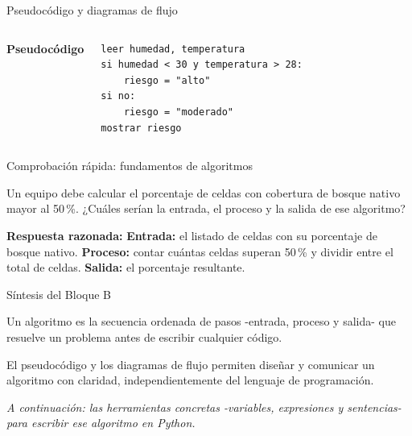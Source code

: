 \documentclass[aspectratio=169,11pt]{beamer}
\begin{document}
\begin{frame}[fragile]{Pseudocódigo y diagramas de flujo}
\small
\begin{columns}[T,onlytextwidth]
\textbf{Pseudocódigo}
\begin{lstlisting}[language={},keywordstyle=\color{grafito}]
leer humedad, temperatura
si humedad < 30 y temperatura > 28:
    riesgo = "alto"
si no:
    riesgo = "moderado"
mostrar riesgo
\end{lstlisting}
\centering
{}
\end{columns}
\end{frame}

\begin{frame}{Comprobación rápida: fundamentos de algoritmos}
\begin{checkbox}
Un equipo debe calcular el porcentaje de celdas con cobertura de bosque nativo mayor al 50\,\%. ¿Cuáles serían la entrada, el proceso y la salida de ese algoritmo?
\end{checkbox}
\vspace{0.2cm}
\begin{keybox}[top=2pt,bottom=2pt]
\footnotesize\textbf{Respuesta razonada:} \textbf{Entrada:} el listado de celdas con su porcentaje de bosque nativo. \textbf{Proceso:} contar cuántas celdas superan 50\,\% y dividir entre el total de celdas. \textbf{Salida:} el porcentaje resultante.
\end{keybox}
\end{frame}

\begin{frame}{Síntesis del Bloque B}
\begin{keybox}[top=2pt,bottom=2pt]
\footnotesize Un algoritmo es la secuencia ordenada de pasos -entrada, proceso y salida- que resuelve un problema antes de escribir cualquier código.
\end{keybox}
\begin{keybox}[top=2pt,bottom=2pt]
\footnotesize El pseudocódigo y los diagramas de flujo permiten diseñar y comunicar un algoritmo con claridad, independientemente del lenguaje de programación.
\end{keybox}
\vspace{0.1cm}
\textit{A continuación: las herramientas concretas -variables, expresiones y sentencias- para escribir ese algoritmo en Python.}
\end{frame}
\end{document}
